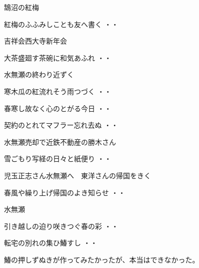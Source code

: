 \vspace{0.6cm}
\noindent 鵠沼の紅梅
\begin{shiika}紅梅のふふみしことも友へ書く
\hfill{・・}\end{shiika}
\vspace{0.6cm}
吉祥会西大寺新年会
\begin{shiika}大茶盛廻す茶碗に和気あふれ
\hfill{・・}\end{shiika}
\vspace{0.6cm}
水無瀬の終わり近ずく
\begin{shiika}寒木瓜の紅流れそう雨つづく
\hfill{・・}\end{shiika}
\begin{shiika}春寒し故なく心のとがる今日
\hfill{・・}\end{shiika}
\begin{shiika}契約のとれてマフラー忘れ去ぬ
\hfill{・・}\end{shiika}
\qquad\qquad\qquad 水無瀬売却で近鉄不動産の勝木さん
\vspace{0.6cm}
\begin{shiika}雪ごもり写経の日々と紙便り
\hfill{・・}\end{shiika}
\vspace{0.6cm}
児玉正志さん水無瀬へ　東洋さんの帰国をきく
\begin{shiika}春風や繰り上げ帰国のよき知らせ
\hfill{・・}\end{shiika}
\vspace{0.6cm}
水無瀬
\begin{shiika}引き越しの迫り咲きつぐ春の彩
\hfill{・・}\end{shiika}
\begin{shiika}転宅の別れの集ひ鰆すし
\hfill{・・}\end{shiika}
\qquad\qquad\qquad 鰆の押しずぬきが作ってみたかったが、本当はできなかった。\\

